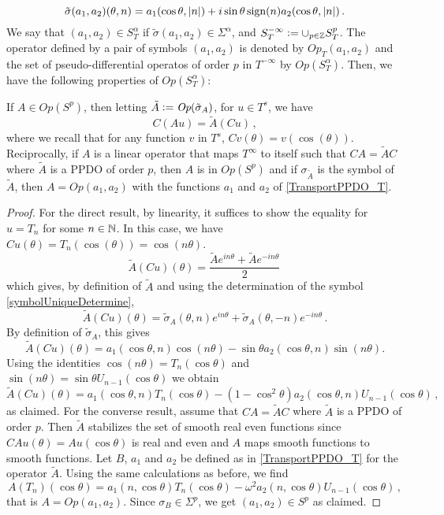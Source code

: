 \documentclass[a4paper]{article}
\begin{document}
\[\tilde{\sigma}(a_1,a_2)(\theta,n) = a_1(\cos\theta,\left\lvert n \right\rvert) + i \sin\theta\,\text{sign}(n) a_2(\cos\theta,\left\lvert n \right\rvert)\,.\]
We say that $(a_1,a_2) \in S^\alpha_T$ if $\tilde{\sigma}(a_1,a_2) \in \Sigma^\alpha$, and $S^{-\infty}_T \mathrel{\mathop:}= \cup_{p \in \mathbb{Z}} S^p_T$. The operator defined by a pair of symbols $(a_1,a_2)$ is denoted by $\textit{Op}_T(a_1,a_2)$ and the set of pseudo-differential operatos of order $p$ in $T^{-\infty}$ by $\textit{Op}(S^\alpha_T)$. 
Then, we have the following properties of $\textit{Op}(S^\alpha_T)$:
\begin{Lem}
	If $A \in \textit{Op}(S^p)$, then letting $\tilde{A} \mathrel{\mathop:}= \textit{Op}(\tilde{\sigma}_A)$, for $u \in T^s$, we have 
	\[C(Au) = \tilde{A} (Cu)\,,\]
	where we recall that for any function $v$ in $T^s$, $Cv(\theta) = v(\cos(\theta))$. 
	Reciprocally, if $A$ is a linear operator that maps $T^\infty$ to itself such that
	$CA = \tilde{A}C$ where $\tilde{A}$ is a PPDO of order $p$, then $A$ is in $\textit{Op}(S^p)$ and if $\sigma_{\tilde{A}}$ is the symbol of $\tilde{A}$, then $A = \textit{Op}(a_1,a_2)$ with the functions $a_1$ and $a_2$ of \autoref{TransportPPDO_T}.
\end{Lem}
\begin{proof}
	For the direct result, by linearity, it suffices to show the equality for $u = T_n$ for some $n \in \mathbb{N}$. In this case, we have $Cu(\theta) = T_n(\cos(\theta)) = \cos(n\theta)$. 
	\[\tilde{A}\left(Cu\right)(\theta) = \frac{\tilde{A}e^{in\theta}+\tilde{A}e^{-in\theta}}{2}\,\]
	which gives, by definition of $\tilde{A}$ and using the determination of the symbol \eqref{symbolUniqueDetermine}, 
	\[\tilde{A}\left(Cu\right)(\theta) = \tilde{\sigma}_A(\theta,n)e^{in\theta} + \tilde{\sigma}_A(\theta,-n)e^{-in\theta}\,.\]
	By definition of $\tilde{\sigma}_A$, this gives 
	\[\tilde{A}\left(Cu\right)(\theta) = a_1(\cos\theta,n)\cos(n\theta) - \sin\theta a_2(\cos\theta,n)\sin(n\theta).\]
	Using the identities $\cos(n\theta) = T_n(\cos\theta)$ and $\sin(n\theta) = \sin\theta U_{n-1}(\cos\theta)$ we obtain
	\[\tilde{A}\left(Cu\right)(\theta) = a_1(\cos\theta,n)T_n(\cos\theta) - (1-\cos^2 \theta) a_2(\cos\theta,n) U_{n-1}(\cos\theta)\,,\]
	as claimed. 
	For the converse result, assume that $CA = \tilde{A}C$ where $\tilde{A}$ is a PPDO of order $p$. Then $\tilde{A}$ stabilizes the set of smooth real even functions since $CAu(\theta) = Au(\cos\theta)$ is real and even and $A$ maps smooth functions to smooth functions. Let $B$, $a_1$ and $a_2$ be defined as in \autoref{TransportPPDO_T} for the operator $\tilde{A}$. Using the same calculations as before, we find 
	\[A(T_n)(\cos \theta) = a_1(n,\cos\theta) T_n(\cos\theta) -\omega^2 a_2(n,\cos\theta) U_{n-1}(\cos\theta)\,,\]
	that is $A = \textit{Op}(a_1,a_2)$. Since $\sigma_B \in \Sigma^p$, we get $(a_1,a_2) \in S^p$ as claimed. 
\end{proof}
\end{document}
